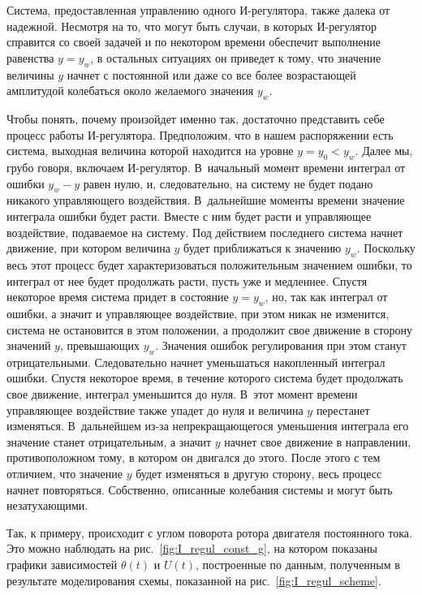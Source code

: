 \documentclass[12pt,a4paper,openany]{extarticle}
\begin{document}
Система, предоставленная управлению одного И-регулятора, также далека от надежной.
Несмотря на то, что могут быть случаи, в которых И-регулятор справится со своей задачей и по некотором времени обеспечит выполнение равенства $y = y_w$, в остальных ситуациях он приведет к тому, что значение величины $y$ начнет с постоянной или даже со все более возрастающей амплитудой колебаться около желаемого значения $y_w$.

Чтобы понять, почему произойдет именно так, достаточно представить себе процесс работы И-регулятора.
Предположим, что в нашем распоряжении есть система, выходная величина которой находится на уровне $y = y_0 < y_w$.
Далее мы, грубо говоря, включаем И-регулятор.
В~начальный момент времени интеграл от ошибки $y_w - y$ равен нулю, и, следовательно, на систему не будет подано никакого управляющего воздействия.
В~дальнейшие моменты времени значение интеграла ошибки будет расти.
Вместе с ним будет расти и управляющее воздействие, подаваемое на систему.
Под действием последнего система начнет движение, при котором величина $y$ будет приближаться к значению $y_w$.
Поскольку весь этот процесс будет характеризоваться положительным значением ошибки, то интеграл от нее будет продолжать расти, пусть уже и медленнее.
Спустя некоторое время система придет в состояние $y = y_w$, но, так как интеграл от ошибки, а значит и управляющее воздействие, при этом никак не изменится, система не остановится в этом положении, а продолжит свое движение в сторону значений $y$, превышающих $y_w$.
Значения ошибок регулирования при этом станут отрицательными.
Следовательно начнет уменьшаться накопленный интеграл ошибки.
Спустя некоторое время, в течение которого система будет продолжать свое движение, интеграл уменьшится до нуля.
В~этот момент времени управляющее воздействие также упадет до нуля и величина $y$ перестанет изменяться.
В~дальнейшем из-за непрекращающегося уменьшения интеграла его значение станет отрицательным, а значит $y$ начнет свое движение в направлении, противоположном тому, в котором он двигался до этого.
После этого с тем отличием, что значение $y$ будет изменяться в другую сторону, весь процесс начнет повторяться.
Собственно, описанные колебания системы и могут быть незатухающими.

Так, к примеру, происходит с углом поворота ротора двигателя постоянного тока.
Это можно наблюдать на рис.~\ref{fig:I_regul_const_g}, на котором показаны графики зависимостей $\theta(t)$ и $U(t)$, построенные по данным, полученным в результате моделирования схемы, показанной на рис.~\ref{fig:I_regul_scheme}.
\end{document}
